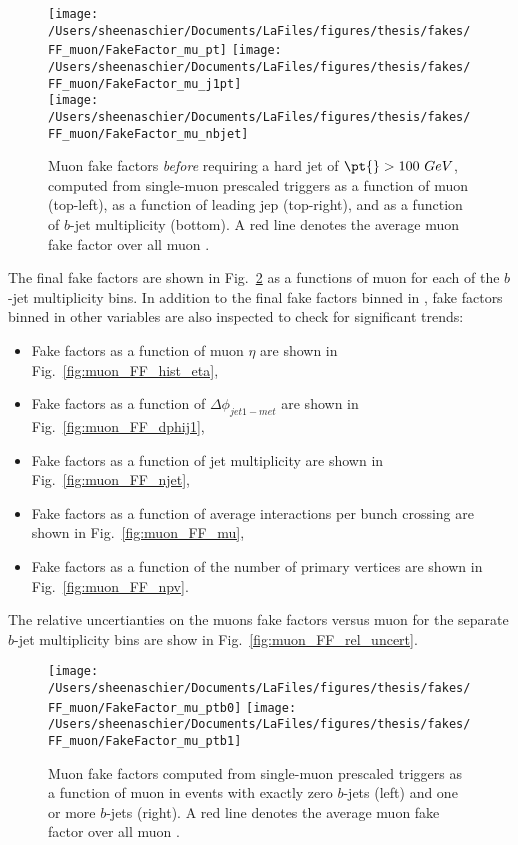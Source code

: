 \begin{figure}[tbp]
  \centering
  \texttt{[image: /Users/sheenaschier/Documents/LaFiles/figures/thesis/fakes/FF\_muon/FakeFactor\_mu\_pt]}
  \texttt{[image: /Users/sheenaschier/Documents/LaFiles/figures/thesis/fakes/FF\_muon/FakeFactor\_mu\_j1pt]}\\
  \texttt{[image: /Users/sheenaschier/Documents/LaFiles/figures/thesis/fakes/FF\_muon/FakeFactor\_mu\_nbjet]}\\
  \caption{Muon fake factors \textit{before} requiring a hard jet of $\pt{}> 100~GeV$, computed from single-muon prescaled triggers as a function of muon \pt{} (top-left), as a function of leading jep \pt{} (top-right), and as a function of $b$-jet multiplicity (bottom). A red line denotes the average muon fake factor over all muon \pt{}.}
  \label{fig:muon_FF_hist_noCut}
\end{figure}

The final fake factors are shown in Fig.~\ref{fig:muon_FF_hist} as a functions of muon \pt{} for each of the $b$-jet multiplicity bins.  In addition to the final fake factors binned in \pt, fake factors binned in other variables are also inspected to check for significant trends:
\begin{itemize}
\item Fake factors as a function of muon $\eta$ are shown in Fig.~\ref{fig:muon_FF_hist_eta},
\item Fake factors as a function of $\Delta\phi_{jet1-met}$ are shown in Fig.~\ref{fig:muon_FF_dphij1},
\item Fake factors as a function of jet multiplicity are shown in Fig.~\ref{fig:muon_FF_njet},
\item Fake factors as a function of average interactions per bunch crossing are shown in Fig.~\ref{fig:muon_FF_mu},
\item Fake factors as a function of the number of primary vertices are shown in Fig.~\ref{fig:muon_FF_npv}.
\end{itemize}
The relative uncertianties on the muons fake factors versus muon \pt{} for the separate $b$-jet multiplicity bins are show in Fig.~\ref{fig:muon_FF_rel_uncert}.

\begin{figure}[tbp]
  \centering
  \texttt{[image: /Users/sheenaschier/Documents/LaFiles/figures/thesis/fakes/FF\_muon/FakeFactor\_mu\_ptb0]}
  \texttt{[image: /Users/sheenaschier/Documents/LaFiles/figures/thesis/fakes/FF\_muon/FakeFactor\_mu\_ptb1]}\\
  \caption{Muon fake factors computed from single-muon prescaled triggers as a function of muon \pt{} in events with exactly zero $b$-jets (left) and one or more $b$-jets (right). A red line denotes the average muon fake factor over all muon \pt{}.}
  \label{fig:muon_FF_hist}
\end{figure}

